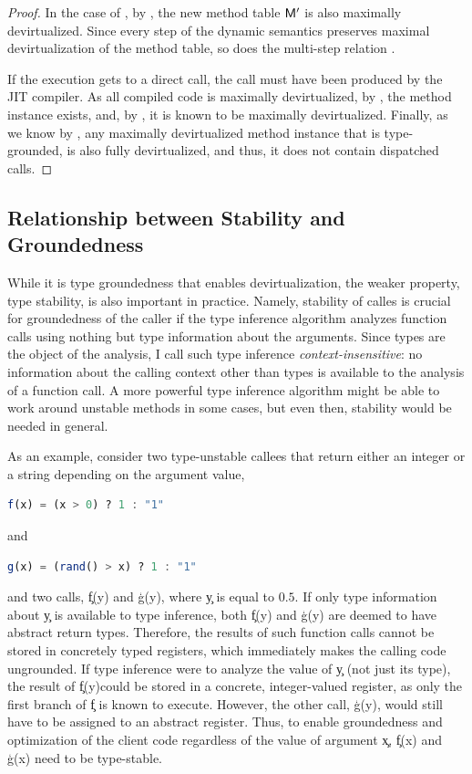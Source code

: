 {{\begin{proof}
  In the case of , by ,
  the new method table $\mathsf{M}'$ is also maximally devirtualized.
  Since every step of the dynamic semantics preserves maximal devirtualization
  of the method table, so does the multi-step relation \stepmul.

  If the execution gets to a direct call, the call must have been produced
  by the JIT compiler.  As all compiled code is maximally devirtualized,
  by , the method instance \msig\m{\ol{\Ty}} exists,
  and, by , it is known to be maximally devirtualized.
  Finally, as we know by , any maximally devirtualized
  method instance that is type-grounded, is also fully devirtualized,
  and thus, it does not contain dispatched calls.
\end{proof}
}

}

\subsection{Relationship between Stability and Groundedness}\label{sec:stable}

While it is type groundedness that enables devirtualization,
the weaker property, type stability, is also important in practice.
Namely, stability of calles is crucial for groundedness
of the caller if the type inference algorithm
analyzes function calls using nothing but type information about the
arguments. Since
types are the object of the analysis, I call such type inference
\emph{context-insensitive}: no information about the calling context
other than types is available to the analysis of a function call.
A more powerful type inference algorithm might be able to work around
unstable methods in some cases, but even then, stability would be needed in general.

As an example, consider two type-unstable callees that return either an integer
or a string depending on the argument value, %
\begin{lstlisting}[language=julia]
  f(x) = (x > 0) ? 1 : "1"
\end{lstlisting}
and %
\begin{lstlisting}[language=julia]
  g(x) = (rand() > x) ? 1 : "1"
\end{lstlisting}
and two calls, \c{f(y)} and \c{g(y)}, where
\c{y} is equal to $0.5$. If only type information about \c{y} is available to
type inference, both \c{f(y)} and \c{g(y)} are deemed to have abstract return
types. Therefore, the results of such function calls cannot be stored in
concretely typed registers, which immediately makes the calling code ungrounded.
If type inference were to analyze the value of \c{y} (not just its type),
the result of \c{f(y)}\!could be stored in a concrete, integer-valued register,
as only the first branch of \c{f} is known to execute. However, the other call,
\c{g(y)}, would still have to be assigned to an abstract register.
Thus, to enable groundedness and optimization of the client code regardless of
the value of argument \c{x}, \c{f(x)} and \c{g(x)} need to be type-stable.

